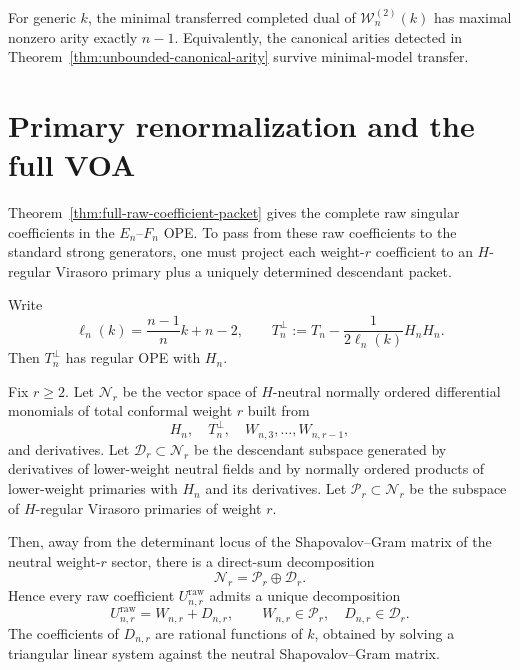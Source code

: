 \begin{conjecture}
\label{conj:minimal-arity-subregular}
For generic $k$, the minimal transferred completed dual of
$\mathcal W_n^{(2)}(k)$ has maximal nonzero arity exactly $n-1$.  Equivalently,
the canonical arities detected in
Theorem~\ref{thm:unbounded-canonical-arity} survive minimal-model transfer.
\end{conjecture}

\section{Primary renormalization and the full VOA}

Theorem~\ref{thm:full-raw-coefficient-packet} gives the complete raw singular
coefficients in the $E_n$--$F_n$ OPE.  To pass from these raw coefficients to
the standard strong generators, one must project each weight-$r$ coefficient to
an $H$-regular Virasoro primary plus a uniquely determined descendant packet.

\begin{definition}
\label{def:orthogonal-stress}
Write
\[
\ell_n(k)=\frac{n-1}{n}k+n-2,
\qquad
T_n^\perp:=T_n-\frac{1}{2\ell_n(k)}H_nH_n.
\]
Then $T_n^\perp$ has regular OPE with $H_n$.
\end{definition}

\begin{theorem}
\label{thm:triangular-primary-renormalization}
Fix $r\geq 2$.  Let $\mathcal N_r$ be the vector space of $H$-neutral
normally ordered differential monomials of total conformal weight $r$ built from
\[
H_n,\quad T_n^\perp,\quad W_{n,3},\dots,W_{n,r-1},
\]
and derivatives.  Let $\mathcal D_r\subset \mathcal N_r$ be the descendant
subspace generated by derivatives of lower-weight neutral fields and by
normally ordered products of lower-weight primaries with $H_n$ and its
derivatives.  Let $\mathcal P_r\subset \mathcal N_r$ be the subspace of
$H$-regular Virasoro primaries of weight $r$.

Then, away from the determinant locus of the Shapovalov--Gram matrix of the
neutral weight-$r$ sector, there is a direct-sum decomposition
\[
\mathcal N_r=\mathcal P_r\oplus \mathcal D_r.
\]
Hence every raw coefficient $U_{n,r}^{\mathrm{raw}}$ admits a unique
decomposition
\[
U_{n,r}^{\mathrm{raw}}=W_{n,r}+D_{n,r},
\qquad
W_{n,r}\in \mathcal P_r,
\quad
D_{n,r}\in \mathcal D_r.
\]
The coefficients of $D_{n,r}$ are rational functions of $k$, obtained by
solving a triangular linear system against the neutral Shapovalov--Gram matrix.
\end{theorem}

